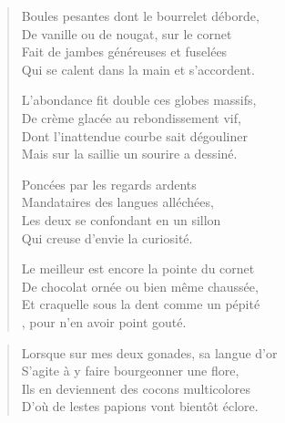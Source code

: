 \begin{verse}
Boules pesantes dont le bourrelet déborde,\\
De vanille ou de nougat, sur le cornet\\
Fait de jambes généreuses et fuselées\\
Qui se calent dans la main et s’accordent.

L’abondance fit double ces globes massifs,\\
De crème glacée au rebondissement vif,\\
Dont l’inattendue courbe sait dégouliner\\
Mais sur la saillie un sourire a dessiné.

Poncées par les regards ardents\\
Mandataires des langues alléchées,\\
Les deux se confondant en un sillon\\
Qui creuse d’envie la curiosité.

Le meilleur est encore la pointe du cornet\\
De chocolat ornée ou bien même chaussée,\\
Et craquelle sous la dent comme un pépité\\
, pour n’en avoir point gouté.
\end{verse}

\begin{verse}
Lorsque sur mes deux gonades, sa langue d’or\\
S’agite à y faire bourgeonner une flore,\\
Ils en deviennent des cocons multicolores\\
D’où de lestes papions vont bientôt éclore.
\end{verse}

